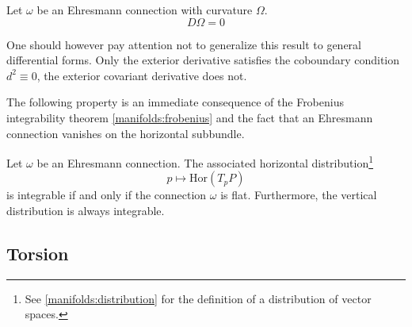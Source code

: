 	\begin{property}
		Let $\omega$ be an Ehresmann connection with curvature $\Omega$.
		\begin{equation}
			\boxed{D\Omega = 0}
		\end{equation}
	\end{property}
	\begin{remark}
		One should however pay attention not to generalize this result\mnote{\dbend} to general differential forms. Only the exterior derivative satisfies the coboundary condition $d^2 \equiv 0$, the exterior covariant derivative does not.
	\end{remark}
	
	
	The following property is an immediate consequence of the Frobenius integrability theorem \ref{manifolds:frobenius} and the fact that an Ehresmann connection vanishes on the horizontal subbundle.
	\begin{property}
		Let $\omega$ be an Ehresmann connection. The associated horizontal distribution\footnote{See \ref{manifolds:distribution} for the definition of a distribution of vector spaces.}\[p\mapsto\text{Hor}(T_pP)\]is integrable if and only if the connection $\omega$ is flat. Furthermore, the vertical distribution is always integrable.
	\end{property}
	
	
\subsection{Torsion}

	
